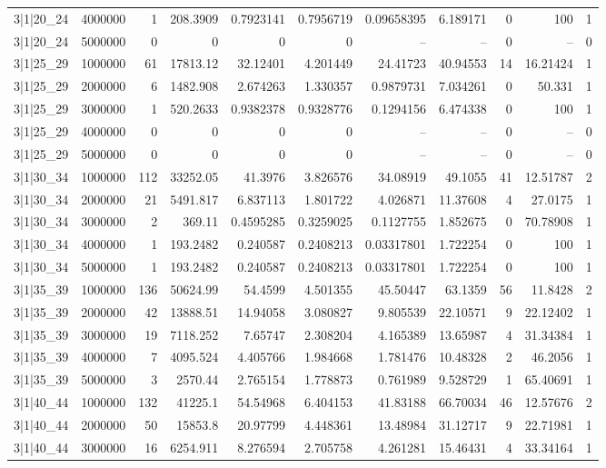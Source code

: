 \begin{tabular}{lrrrrrrrrrr}
3|1|20\_24 & 4000000 & 1 & 208.3909 & 0.7923141 & 0.7956719 & 0.09658395 & 6.189171 & 0 & 100 & 1 \\
3|1|20\_24 & 5000000 & 0 & 0 & 0 & 0 & -- & -- & 0 & -- & 0 \\
3|1|25\_29 & 1000000 & 61 & 17813.12 & 32.12401 & 4.201449 & 24.41723 & 40.94553 & 14 & 16.21424 & 1 \\
3|1|25\_29 & 2000000 & 6 & 1482.908 & 2.674263 & 1.330357 & 0.9879731 & 7.034261 & 0 & 50.331 & 1 \\
3|1|25\_29 & 3000000 & 1 & 520.2633 & 0.9382378 & 0.9328776 & 0.1294156 & 6.474338 & 0 & 100 & 1 \\
3|1|25\_29 & 4000000 & 0 & 0 & 0 & 0 & -- & -- & 0 & -- & 0 \\
3|1|25\_29 & 5000000 & 0 & 0 & 0 & 0 & -- & -- & 0 & -- & 0 \\
3|1|30\_34 & 1000000 & 112 & 33252.05 & 41.3976 & 3.826576 & 34.08919 & 49.1055 & 41 & 12.51787 & 2 \\
3|1|30\_34 & 2000000 & 21 & 5491.817 & 6.837113 & 1.801722 & 4.026871 & 11.37608 & 4 & 27.0175 & 1 \\
3|1|30\_34 & 3000000 & 2 & 369.11 & 0.4595285 & 0.3259025 & 0.1127755 & 1.852675 & 0 & 70.78908 & 1 \\
3|1|30\_34 & 4000000 & 1 & 193.2482 & 0.240587 & 0.2408213 & 0.03317801 & 1.722254 & 0 & 100 & 1 \\
3|1|30\_34 & 5000000 & 1 & 193.2482 & 0.240587 & 0.2408213 & 0.03317801 & 1.722254 & 0 & 100 & 1 \\
3|1|35\_39 & 1000000 & 136 & 50624.99 & 54.4599 & 4.501355 & 45.50447 & 63.1359 & 56 & 11.8428 & 2 \\
3|1|35\_39 & 2000000 & 42 & 13888.51 & 14.94058 & 3.080827 & 9.805539 & 22.10571 & 9 & 22.12402 & 1 \\
3|1|35\_39 & 3000000 & 19 & 7118.252 & 7.65747 & 2.308204 & 4.165389 & 13.65987 & 4 & 31.34384 & 1 \\
3|1|35\_39 & 4000000 & 7 & 4095.524 & 4.405766 & 1.984668 & 1.781476 & 10.48328 & 2 & 46.2056 & 1 \\
3|1|35\_39 & 5000000 & 3 & 2570.44 & 2.765154 & 1.778873 & 0.761989 & 9.528729 & 1 & 65.40691 & 1 \\
3|1|40\_44 & 1000000 & 132 & 41225.1 & 54.54968 & 6.404153 & 41.83188 & 66.70034 & 46 & 12.57676 & 2 \\
3|1|40\_44 & 2000000 & 50 & 15853.8 & 20.97799 & 4.448361 & 13.48984 & 31.12717 & 9 & 22.71981 & 1 \\
3|1|40\_44 & 3000000 & 16 & 6254.911 & 8.276594 & 2.705758 & 4.261281 & 15.46431 & 4 & 33.34164 & 1 \\

\end{tabular}
